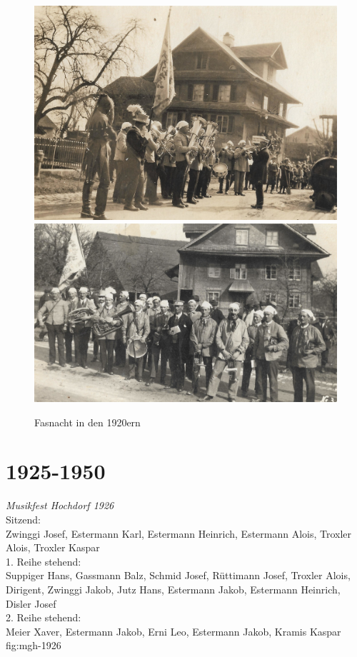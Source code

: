 \documentclass[]{book}
\begin{document}

\begin{figure}[!ht]
    \centerline{
        \includegraphics{./chap/1900-1925/Fasnacht-1920er-1.jpg}
        \includegraphics{./chap/1900-1925/Fasnacht-1920er-2.jpg}}
    \label{fig:mgh-fasnacht-1920}
    \caption{Fasnacht in den 1920ern}
\end{figure}
\clearpage

\section{1925-1950}


{\emph{Musikfest Hochdorf 1926}\\
    Sitzend:\\
    Zwinggi Josef, Estermann Karl, Estermann Heinrich, Estermann Alois, Troxler
    Alois, Troxler Kaspar\\
    1. Reihe stehend:\\
    Suppiger Hans, Gassmann Balz, Schmid Josef, Rüttimann Josef, Troxler Alois,
    Dirigent, Zwinggi Jakob, Jutz Hans, Estermann Jakob, Estermann Heinrich,
    Disler Josef\\
    2. Reihe stehend:\\
    Meier Xaver, Estermann Jakob, Erni Leo, Estermann Jakob, Kramis Kaspar}
{fig:mgh-1926}
\end{document}
